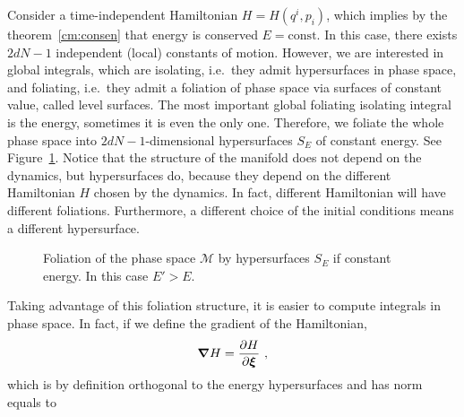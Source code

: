     Consider a time-independent Hamiltonian $H = H(q^i, p_i)$, which implies by the theorem~\eqref{cm:consen} that energy is conserved $E = \text{const}$. In this case, there exists $2dN - 1$ independent (local) constants of motion. However, we are interested in global integrals, which are isolating, i.e.~they admit hypersurfaces in phase space, and foliating, i.e.~they admit a foliation of phase space via surfaces of constant value, called level surfaces. The most important global foliating isolating integral is the energy, sometimes it is even the only one. Therefore, we foliate the whole phase space into $2dN - 1$-dimensional hypersurfaces $S_E$ of constant energy. See Figure~\ref{fig:fol}. Notice that the structure of the manifold does not depend on the dynamics, but hypersurfaces do, because they depend on the different Hamiltonian $H$ chosen by the dynamics. In fact, different Hamiltonian will have different foliations. Furthermore, a different choice of the initial conditions means a different hypersurface.
    \begin{figure}[h!]
        \centering
        \label{fig:fol}
        \caption{Foliation of the phase space $\mathcal M$ by hypersurfaces $S_E$ if constant energy. In this case $E' > E$.}
    \end{figure}
    Taking advantage of this foliation structure, it is easier to compute integrals in phase space. In fact, if we define the gradient of the Hamiltonian,
    \begin{equation*}
        \boldsymbol \nabla H = \frac{\partial H}{\partial\boldsymbol \xi} ~,
    \end{equation*}
    which is by definition orthogonal to the energy hypersurfaces and has norm equals to 
